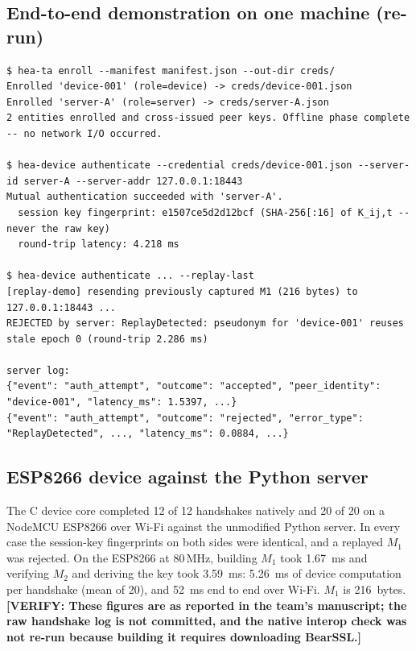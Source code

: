 \documentclass[12pt,a4paper,oneside]{report}
\numberwithin{equation}{chapter}
\newcommand{\VERIFY}[1]{\textcolor{orange!85!black}{\textbf{[VERIFY: #1]}}}
\begin{document}
\subsection*{End-to-end demonstration on one machine (re-run)}
\begin{lstlisting}[numbers=none,basicstyle=\ttfamily\scriptsize,caption={CLI demo output: enrolment, successful authentication, replay rejection and server log},label={lst:demo}]
$ hea-ta enroll --manifest manifest.json --out-dir creds/
Enrolled 'device-001' (role=device) -> creds/device-001.json
Enrolled 'server-A' (role=server) -> creds/server-A.json
2 entities enrolled and cross-issued peer keys. Offline phase complete -- no network I/O occurred.

$ hea-device authenticate --credential creds/device-001.json --server-id server-A --server-addr 127.0.0.1:18443
Mutual authentication succeeded with 'server-A'.
  session key fingerprint: e1507ce5d2d12bcf (SHA-256[:16] of K_ij,t -- never the raw key)
  round-trip latency: 4.218 ms

$ hea-device authenticate ... --replay-last
[replay-demo] resending previously captured M1 (216 bytes) to 127.0.0.1:18443 ...
REJECTED by server: ReplayDetected: pseudonym for 'device-001' reuses stale epoch 0 (round-trip 2.286 ms)

server log:
{"event": "auth_attempt", "outcome": "accepted", "peer_identity": "device-001", "latency_ms": 1.5397, ...}
{"event": "auth_attempt", "outcome": "rejected", "error_type": "ReplayDetected", ..., "latency_ms": 0.0884, ...}
\end{lstlisting}

\subsection*{ESP8266 device against the Python server}
The C device core completed 12 of 12 handshakes natively and 20 of 20 on a NodeMCU ESP8266 over Wi-Fi against the unmodified Python server. In every case the session-key fingerprints on both sides were identical, and a replayed $M_1$ was rejected. On the ESP8266 at 80\,MHz, building $M_1$ took 1.67~ms and verifying $M_2$ and deriving the key took 3.59~ms: 5.26~ms of device computation per handshake (mean of 20), and 52~ms end to end over Wi-Fi. $M_1$ is 216~bytes. \VERIFY{These figures are as reported in the team's manuscript; the raw handshake log is not committed, and the native interop check was not re-run because building it requires downloading BearSSL.}
\end{document}
